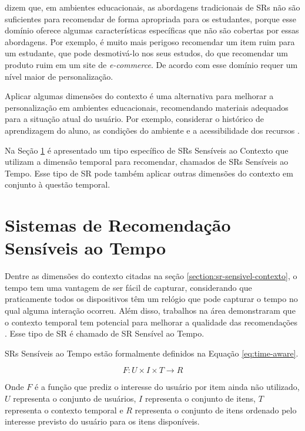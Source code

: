  dizem que, em ambientes educacionais, as abordagens tradicionais de SRs não são
suficientes para recomendar de forma apropriada para os estudantes, porque esse domínio oferece algumas características
específicas que não são cobertas por essas abordagens. Por exemplo, é muito mais perigoso recomendar um item ruim para
um estudante, que pode desmotivá-lo nos seus estudos, do que recomendar um produto ruim em um site de \textit{e-commerce}.
De acordo com  esse domínio requer um nível maior de personalização.

Aplicar algumas dimensões do contexto é uma alternativa para melhorar a personalização em ambientes educacionais,
recomendando materiais adequados para a situação atual do usuário. Por exemplo, considerar o histórico de aprendizagem
do aluno, as condições do ambiente e a acessibilidade dos recursos \cite{verbert2012context}.

Na Seção \ref{section:sr-sensivel-tempo} é apresentado um tipo específico de SRs Sensíveis ao Contexto que utilizam a dimensão temporal para
recomendar, chamados de SRs Sensíveis ao Tempo. Esse tipo de SR pode também aplicar outras dimensões do contexto em
conjunto à questão temporal.

\section{Sistemas de Recomendação Sensíveis ao Tempo}\label{section:sr-sensivel-tempo}

Dentre as dimensões do contexto citadas na seção \ref{section:sr-sensivel-contexto}, o tempo tem uma vantagem de ser
fácil de capturar, considerando que praticamente todos os dispositivos têm um relógio que pode capturar o tempo no qual
alguma interação ocorreu. Além disso, trabalhos na área demonstraram que o contexto temporal tem potencial para melhorar
a qualidade das recomendações \cite{campos2014time}. Esse tipo de SR é chamado de SR Sensível ao Tempo.

SRs Sensíveis ao Tempo estão formalmente definidos na Equação \ref{eq:time-aware}.

\begin{equation}
  F: U \times I \times T \rightarrow R
  \label{eq:time-aware}
\end{equation}

Onde $F$ é a função que prediz o interesse do usuário por item ainda não utilizado, $U$ representa o conjunto de usuários,
$I$ representa o conjunto de itens, $T$ representa o contexto temporal e $R$ representa o conjunto de itens ordenado pelo
interesse previsto do usuário para os itens disponíveis.

